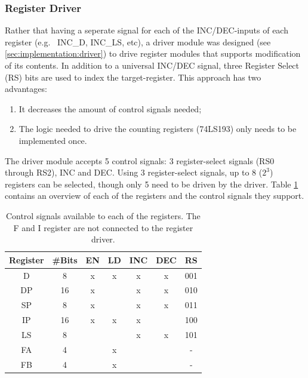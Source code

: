 \subsubsection*{Register Driver} \label{sec:architecture:cu:driver}
Rather that having a seperate signal for each of the INC/DEC-inputs of each register (e.g.~ INC\_D, INC\_LS, etc), a driver module was designed (see \ref{sec:implementation:driver}) to drive register modules that supports modification of its contents. In addition to a universal INC/DEC signal, three Register Select (RS) bits are used to index the target-register. This approach has two advantages:
\begin{enumerate}
\item It decreases the amount of control signals needed;
\item The logic needed to drive the counting registers (74LS193) only needs to be implemented once.
\end{enumerate}

The driver module accepts 5 control signals: 3 register-select signals (RS0 through RS2), INC and DEC. Using 3 register-select signals, up to 8 ($2^3$) registers can be selected, though only 5 need to be driven by the driver. Table \ref{tab:registers} contains an overview of each of the registers and the control signals they support.

\begin{table}[H]
  \centering
  \begin{tabular}{c|c|c|c|c|c|c}
    Register & \#Bits & EN  & LD  & INC  & DEC & RS \\ \hline 
    D        & 8      & x   & x   & x    & x   & 001 \\
    DP       & 16     & x   &     & x    & x   & 010 \\ 
    SP       & 8      & x   &     & x    & x   & 011 \\ 
    IP       & 16     & x   & x   & x    &     & 100 \\ 
    LS       & 8      &     &     & x    & x   & 101 \\ 
    FA       & 4      &     & x   &      &     & -   \\ 
    FB       & 4      &     & x   &      &     & -   \\
  \end{tabular}
  \caption{Control signals available to each of the registers. The F and I register are not connected to the register driver.}
  \label{tab:registers}
\end{table}


